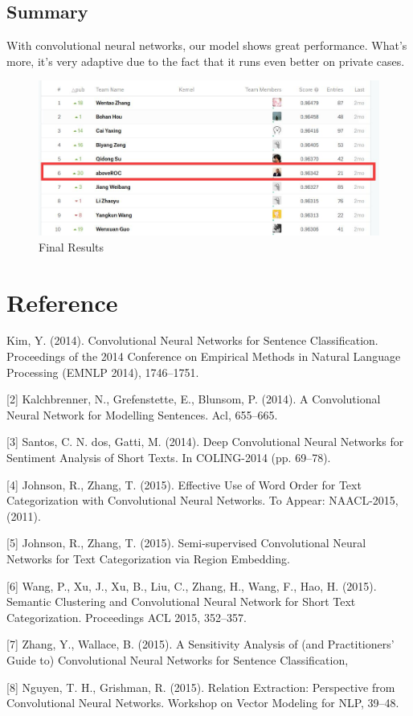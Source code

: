 \documentclass{article}
\begin{document}
\subsection{Summary}
\quad With convolutional neural networks, our model shows great performance. What's more, it's very adaptive due to the fact that it runs even better on private cases.

\begin{figure}[H]
\centering
\includegraphics[width=.4\textwidth]{3.jpg}
\caption{Final Results}
\end{figure}

\section{Reference}

\quad    [1] Kim, Y. (2014). Convolutional Neural Networks for Sentence Classification. Proceedings of the 2014 Conference on Empirical Methods in Natural Language Processing (EMNLP 2014), 1746–1751.

    [2] Kalchbrenner, N., Grefenstette, E.,  Blunsom, P. (2014). A Convolutional Neural Network for Modelling Sentences. Acl, 655–665.

    [3] Santos, C. N. dos,  Gatti, M. (2014). Deep Convolutional Neural Networks for Sentiment Analysis of Short Texts. In COLING-2014 (pp. 69–78).

    [4] Johnson, R.,  Zhang, T. (2015). Effective Use of Word Order for Text Categorization with Convolutional Neural Networks. To Appear: NAACL-2015, (2011).

    [5] Johnson, R.,  Zhang, T. (2015). Semi-supervised Convolutional Neural Networks for Text Categorization via Region Embedding.

    [6] Wang, P., Xu, J., Xu, B., Liu, C., Zhang, H., Wang, F.,  Hao, H. (2015). Semantic Clustering and Convolutional Neural Network for Short Text Categorization. Proceedings ACL 2015, 352–357.

    [7] Zhang, Y.,  Wallace, B. (2015). A Sensitivity Analysis of (and Practitioners’ Guide to) Convolutional Neural Networks for Sentence Classification,

    [8] Nguyen, T. H.,  Grishman, R. (2015). Relation Extraction: Perspective from Convolutional Neural Networks. Workshop on Vector Modeling for NLP, 39–48.
\end{document}
